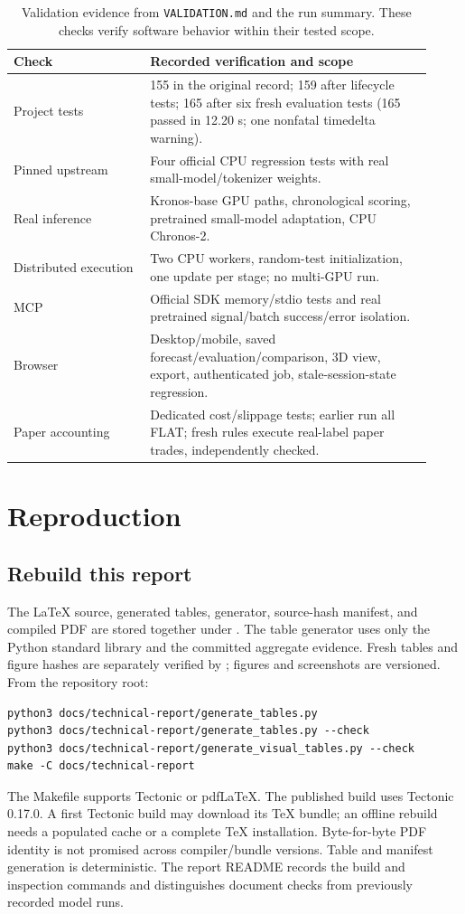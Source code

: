 \documentclass[11pt,a4paper]{article}
\newcommand{\code}[1]{\texttt{\detokenize{#1}}}
\begin{document}
\begin{table}[htbp]
\centering\small
\begin{tabular}{@{}p{0.30\linewidth}p{0.62\linewidth}@{}}
\toprule
Check & Recorded verification and scope \\
\midrule
Project tests & 155 in the original record; 159 after lifecycle tests; 165 after six fresh evaluation tests (165 passed in 12.20 s; one nonfatal timedelta warning). \\
Pinned upstream & Four official CPU regression tests with real small-model/tokenizer weights. \\
Real inference & Kronos-base GPU paths, chronological scoring, pretrained small-model adaptation, CPU Chronos-2. \\
Distributed execution & Two CPU workers, random-test initialization, one update per stage; no multi-GPU run. \\
MCP & Official SDK memory/stdio tests and real pretrained signal/batch success/error isolation. \\
Browser & Desktop/mobile, saved forecast/evaluation/comparison, 3D view, export, authenticated job, stale-session-state regression. \\
Paper accounting & Dedicated cost/slippage tests; earlier run all FLAT; fresh rules execute real-label paper trades, independently checked. \\
\bottomrule
\end{tabular}
\caption{Validation evidence from \texttt{VALIDATION.md} and the run summary.
These checks verify software behavior within their tested scope.}
\end{table}

\section{Reproduction}
\subsection{Rebuild this report}
The LaTeX source, generated tables, generator, source-hash manifest, and compiled
PDF are stored together under \code{docs/technical-report/}. The table generator
uses only the Python standard library and the committed aggregate evidence.
Fresh tables and figure hashes are separately verified by
\code{generate_visual_tables.py}; figures and screenshots are versioned.
From the repository root:
\begin{lstlisting}
python3 docs/technical-report/generate_tables.py
python3 docs/technical-report/generate_tables.py --check
python3 docs/technical-report/generate_visual_tables.py --check
make -C docs/technical-report
\end{lstlisting}
The Makefile supports Tectonic or pdfLaTeX. The published build uses Tectonic
0.17.0. A first Tectonic build may download its TeX bundle; an offline rebuild
needs a populated cache or a complete TeX installation. Byte-for-byte PDF
identity is not promised across compiler/bundle versions. Table and manifest
generation is deterministic. The report README records the build and inspection
commands and distinguishes document checks from previously recorded model runs.
\end{document}
